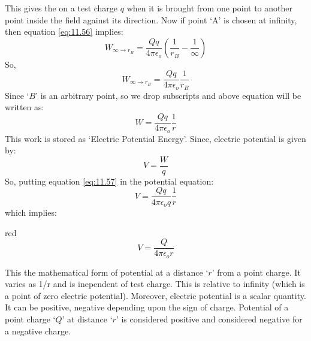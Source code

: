 This gives the on a test charge $q$ when it is brought from one
point to another point inside the field against its direction. Now if point `A'
is chosen at infinity, then equation \ref{eq:11.56} implies:
\begin{equation}
  W_{\infty\rightarrow r_{B}} = \frac{Qq}{4\pi\epsilon_{o} } (\frac{1}{r_{B}} - \frac{1}{\infty}) \nonumber
\end{equation}
So,
\begin{equation}
  W_{\infty\rightarrow r_{B}} = \frac{Qq}{4\pi\epsilon_{o} } \frac{1}{r_{B}} \nonumber
\end{equation}
Since `$B$' is an arbitrary point, so we drop subscripts and above equation will
be written as:
\begin{equation}\label{eq:11.57}
  W = \frac{Qq}{4\pi\epsilon_{o} } \frac{1}{r}
\end{equation}
This work is stored as `Electric Potential Energy'. Since, electric potential is given by:
\begin{equation}
  V = \frac{W}{q} \nonumber
\end{equation}
So, putting equation \ref{eq:11.57} in the potential equation:
\begin{equation}
  V = \frac{Qq}{4\pi\epsilon_{o} q} \frac{1}{r} \nonumber
\end{equation}
which implies:
\begin{mybox}{red}{}
\begin{equation}\label{eq:11.58}
  V = \frac{Q}{4\pi\epsilon_{o}r} 
\end{equation}
\end{mybox}
This the mathematical form of potential at a distance `$r$' from a
point charge. It varies as 1/r and is inependent of test charge.
This is relative to infinity (which is a point of zero electric potential).
Moreover, electric potential is a scalar quantity. It can be positive,
negative depending upon the sign of charge. Potential of a point charge `$Q$'
at distance `$r$' is considered positive and considered negative for a
negative charge.

